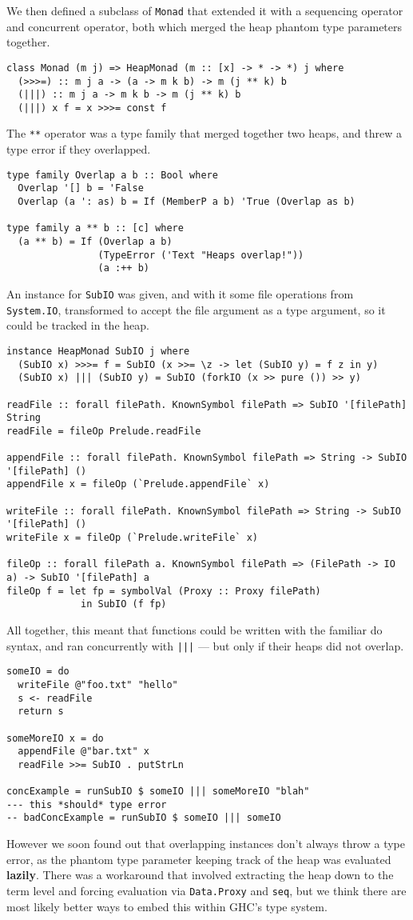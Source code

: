 We then defined a subclass of \texttt{Monad} that
extended it with a sequencing operator and concurrent operator, both
which merged the heap phantom type parameters together.
\begin{verbatim}
class Monad (m j) => HeapMonad (m :: [x] -> * -> *) j where
  (>>>=) :: m j a -> (a -> m k b) -> m (j ** k) b
  (|||) :: m j a -> m k b -> m (j ** k) b
  (|||) x f = x >>>= const f
\end{verbatim}
The \texttt{**} operator was a type family that merged
together two heaps, and threw a type error if they overlapped.
\begin{verbatim}
type family Overlap a b :: Bool where
  Overlap '[] b = 'False
  Overlap (a ': as) b = If (MemberP a b) 'True (Overlap as b)

type family a ** b :: [c] where
  (a ** b) = If (Overlap a b)
                (TypeError ('Text "Heaps overlap!"))
                (a :++ b)
\end{verbatim}
An instance for \texttt{SubIO} was given, and with it
some file operations from \texttt{System.IO}, transformed to accept
the file argument as a type argument, so it could be tracked in the heap.
\begin{verbatim}
instance HeapMonad SubIO j where
  (SubIO x) >>>= f = SubIO (x >>= \z -> let (SubIO y) = f z in y)
  (SubIO x) ||| (SubIO y) = SubIO (forkIO (x >> pure ()) >> y)

readFile :: forall filePath. KnownSymbol filePath => SubIO '[filePath] String
readFile = fileOp Prelude.readFile

appendFile :: forall filePath. KnownSymbol filePath => String -> SubIO '[filePath] ()
appendFile x = fileOp (`Prelude.appendFile` x)

writeFile :: forall filePath. KnownSymbol filePath => String -> SubIO '[filePath] ()
writeFile x = fileOp (`Prelude.writeFile` x)

fileOp :: forall filePath a. KnownSymbol filePath => (FilePath -> IO a) -> SubIO '[filePath] a
fileOp f = let fp = symbolVal (Proxy :: Proxy filePath)
             in SubIO (f fp)
\end{verbatim}
All together, this meant that functions could be written with the
familiar do syntax, and ran concurrently with
\texttt{|||} --- but only if their heaps did not overlap.
\begin{verbatim}
someIO = do
  writeFile @"foo.txt" "hello"
  s <- readFile
  return s

someMoreIO x = do
  appendFile @"bar.txt" x
  readFile >>= SubIO . putStrLn

concExample = runSubIO $ someIO ||| someMoreIO "blah"
--- this *should* type error
-- badConcExample = runSubIO $ someIO ||| someIO
\end{verbatim}
However we soon found out that overlapping instances don't always
throw a type error, as the phantom type parameter keeping track of the
heap was evaluated \textbf{lazily}. There was a workaround that
involved extracting the heap down to the term level and forcing
evaluation via \texttt{Data.Proxy} and
\texttt{seq}, but we think there are most likely better
ways to embed this within GHC's type system.

